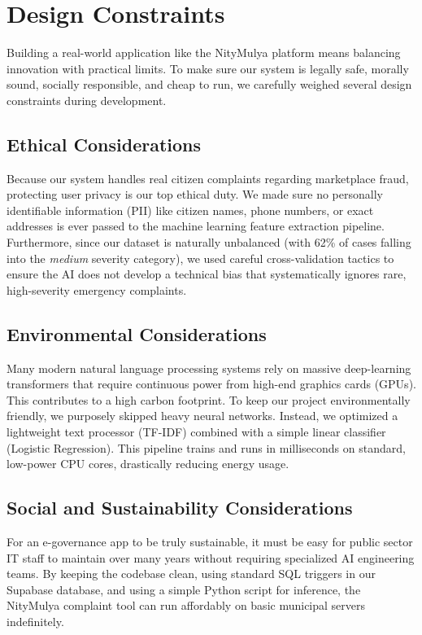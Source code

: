 \documentclass[12pt,a4paper,openany]{book}
\begin{document}
\section{Design Constraints}
Building a real-world application like the NityMulya platform means balancing innovation with practical limits. To make sure our system is legally safe, morally sound, socially responsible, and cheap to run, we carefully weighed several design constraints during development.

\subsection{Ethical Considerations}
Because our system handles real citizen complaints regarding marketplace fraud, protecting user privacy is our top ethical duty. We made sure no personally identifiable information (PII) like citizen names, phone numbers, or exact addresses is ever passed to the machine learning feature extraction pipeline. Furthermore, since our dataset is naturally unbalanced (with 62\% of cases falling into the \textit{medium} severity category), we used careful cross-validation tactics to ensure the AI does not develop a technical bias that systematically ignores rare, high-severity emergency complaints.

\subsection{Environmental Considerations}
Many modern natural language processing systems rely on massive deep-learning transformers that require continuous power from high-end graphics cards (GPUs). This contributes to a high carbon footprint. To keep our project environmentally friendly, we purposely skipped heavy neural networks. Instead, we optimized a lightweight text processor (TF-IDF) combined with a simple linear classifier (Logistic Regression). This pipeline trains and runs in milliseconds on standard, low-power CPU cores, drastically reducing energy usage.

\subsection{Social and Sustainability Considerations}
For an e-governance app to be truly sustainable, it must be easy for public sector IT staff to maintain over many years without requiring specialized AI engineering teams. By keeping the codebase clean, using standard SQL triggers in our Supabase database, and using a simple Python script for inference, the NityMulya complaint tool can run affordably on basic municipal servers indefinitely.
\end{document}
